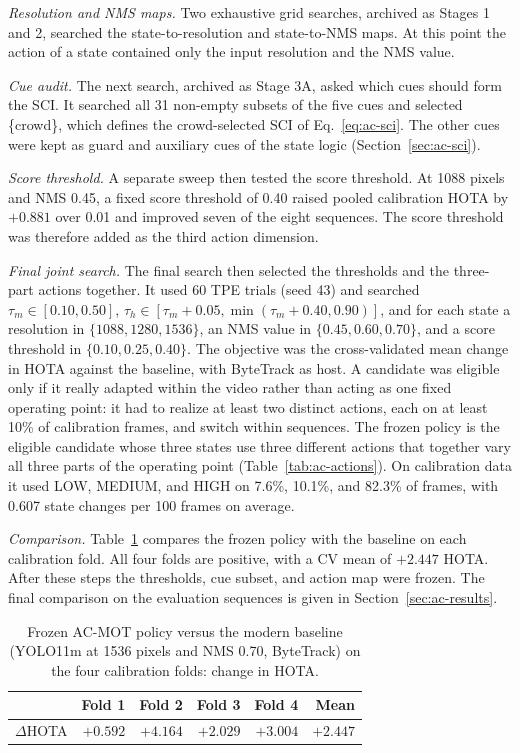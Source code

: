 \emph{Resolution and NMS maps.} Two exhaustive grid searches, archived as Stages 1 and 2, searched the state-to-resolution and state-to-NMS maps. At this point the action of a state contained only the input resolution and the NMS value.

\emph{Cue audit.} The next search, archived as Stage 3A, asked which cues should form the SCI. It searched all 31 non-empty subsets of the five cues and selected \{crowd\}, which defines the crowd-selected SCI of Eq.~\eqref{eq:ac-sci}. The other cues were kept as guard and auxiliary cues of the state logic (Section~\ref{sec:ac-sci}).

\emph{Score threshold.} A separate sweep then tested the score threshold. At 1088 pixels and NMS 0.45, a fixed score threshold of 0.40 raised pooled calibration HOTA by $+0.881$ over 0.01 and improved seven of the eight sequences. The score threshold was therefore added as the third action dimension.

\emph{Final joint search.} The final search then selected the thresholds and the three-part actions together. It used 60 TPE trials (seed 43) and searched $\tau_m\in[0.10,0.50]$, $\tau_h\in[\tau_m+0.05,\min(\tau_m+0.40,0.90)]$, and for each state a resolution in $\{1088,1280,1536\}$, an NMS value in $\{0.45,0.60,0.70\}$, and a score threshold in $\{0.10,0.25,0.40\}$. The objective was the cross-validated mean change in HOTA against the baseline, with ByteTrack as host. A candidate was eligible only if it really adapted within the video rather than acting as one fixed operating point: it had to realize at least two distinct actions, each on at least 10\% of calibration frames, and switch within sequences. The frozen policy is the eligible candidate whose three states use three different actions that together vary all three parts of the operating point (Table~\ref{tab:ac-actions}). On calibration data it used LOW, MEDIUM, and HIGH on 7.6\%, 10.1\%, and 82.3\% of frames, with 0.607 state changes per 100 frames on average.

\emph{Comparison.} Table~\ref{tab:ac-folds} compares the frozen policy with the baseline on each calibration fold. All four folds are positive, with a CV mean of $+2.447$ HOTA. After these steps the thresholds, cue subset, and action map were frozen. The final comparison on the evaluation sequences is given in Section~\ref{sec:ac-results}.

\begin{table}[tbp]
\centering
\caption{Frozen AC-MOT policy versus the modern baseline (YOLO11m at 1536 pixels and NMS 0.70, ByteTrack) on the four calibration folds: change in HOTA.}
\label{tab:ac-folds}
\begin{tabular}{lrrrrr}
\toprule
 & Fold 1 & Fold 2 & Fold 3 & Fold 4 & Mean\\
\midrule
$\Delta$HOTA & $+0.592$ & $+4.164$ & $+2.029$ & $+3.004$ & $+2.447$\\
\bottomrule
\end{tabular}
\end{table}


